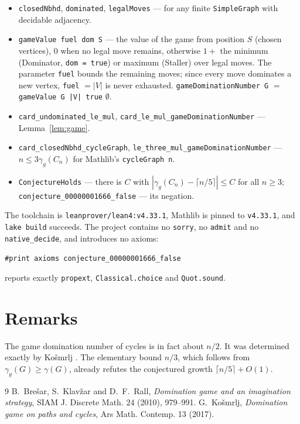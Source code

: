 \documentclass[11pt]{article}
\theoremstyle{plain}
\theoremstyle{definition}
\theoremstyle{remark}
\begin{document}
\begin{itemize}
  \item \texttt{closedNbhd}, \texttt{dominated}, \texttt{legalMoves} --- for
    any finite \texttt{SimpleGraph} with decidable adjacency.
  \item \texttt{gameValue fuel dom S} --- the value of the game from position $S$
    (chosen vertices), $0$ when no legal move remains, otherwise $1+$ the
    minimum (Dominator, \texttt{dom = true}) or maximum (Staller) over legal
    moves. The parameter \texttt{fuel} bounds the remaining moves; since every
    move dominates a new vertex, \texttt{fuel} $=|V|$ is never exhausted.
    \texttt{gameDominationNumber G} $=$ \texttt{gameValue G |V| true} $\emptyset$.
  \item \texttt{card\_undominated\_le\_mul},
    \texttt{card\_le\_mul\_gameDominationNumber} --- Lemma~\ref{lem:game}.
  \item \texttt{card\_closedNbhd\_cycleGraph},
    \texttt{le\_three\_mul\_gameDominationNumber} --- $n\le3\gamma_g(C_n)$ for
    Mathlib's \texttt{cycleGraph n}.
  \item \texttt{ConjectureHolds} --- there is $C$ with
    $|\gamma_g(C_n)-\lceil n/5\rceil|\le C$ for all $n\ge3$;
    \texttt{conjecture\_00000001666\_false} --- its negation.
\end{itemize}

The toolchain is \texttt{leanprover/lean4:v4.33.1}, Mathlib is pinned to
\texttt{v4.33.1}, and \texttt{lake build} succeeds. The project contains no
\texttt{sorry}, no \texttt{admit} and no \texttt{native\_decide}, and
introduces no axioms:
\begin{center}
\texttt{\#print axioms conjecture\_00000001666\_false}
\end{center}
reports exactly \texttt{propext}, \texttt{Classical.choice} and
\texttt{Quot.sound}.

\section{Remarks}

The game domination number of cycles is in fact about $n/2$. It was determined
exactly by Ko\v{s}mrlj \cite{kosmrlj}. The elementary bound $n/3$, which follows
from $\gamma_g(G)\ge\gamma(G)$, already refutes the conjectured growth
$\lceil n/5\rceil+O(1)$.

\begin{thebibliography}{9}
 B.~Bre\v{s}ar, S.~Klav\v{z}ar and D.~F.~Rall, \emph{Domination
  game and an imagination strategy}, SIAM J. Discrete Math. 24 (2010),
  979--991.
 G.~Ko\v{s}mrlj, \emph{Domination game on paths and cycles},
  Ars Math. Contemp. 13 (2017).
\end{thebibliography}
\end{document}
